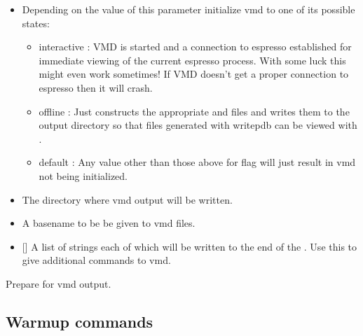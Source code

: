 \begin{itemize}
\item {} Depending on the value of this parameter initialize
  vmd to one of its possible states:
  \begin{itemize}
  \item interactive : VMD is started and a connection to espresso
    established for immediate viewing of the current espresso
    process. With some luck this might even work sometimes! If VMD
    doesn't get a proper connection to espresso then it will crash.
  \item offline : Just constructs the appropriate  and
     files and writes them to the output
    directory so that  files generated with writepdb can
    be viewed with .
  \item default : Any value other than those above for flag will just
    result in vmd not being initialized.
  \end{itemize}
\item {} The directory where vmd output will be written.
\item {} A basename to be be given to vmd files.
\item {} [] A list of strings each of which will be
  written to the end of the . Use this to
  give additional commands to vmd.
\end{itemize}
Prepare for vmd output.

\subsection{Warmup commands}

